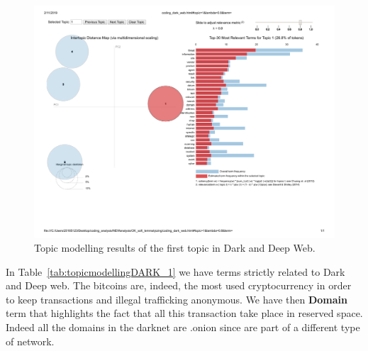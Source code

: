 \begin{figure}[h!]
\begin{center}
\includegraphics[scale=0.5]{./img/DARKDEEP_topic1.pdf}
\end{center}
\caption{Topic modelling results of the first topic in Dark and Deep Web.}
\label{fig:topicmodellingDARK_1}
\end{figure}

In Table~\ref{tab:topicmodellingDARK_1} we have terms strictly related to Dark and Deep web. The bitcoins are, indeed, the most used cryptocurrency in order to keep transactions and illegal trafficking anonymous. We have then \textbf{Domain} term that highlights the fact that all this transaction take place in reserved space. Indeed all the domains in the darknet are .onion since are part of a different type of network. 







\begin{table}[h!]
\caption{Topic analysis results of the second topic for Dark and Deep Web.}
\label{tab:topicmodellingDARK_2}
\end{table}



